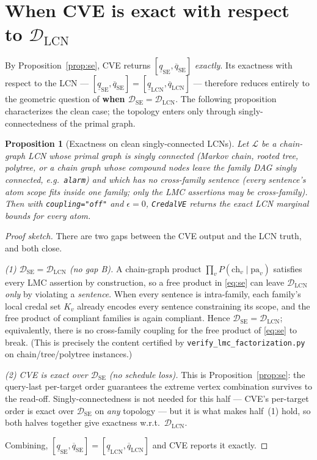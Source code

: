 \documentclass[11pt]{article}
\newtheorem{proposition}{Proposition}
\newcommand{\lo}{\underline}
\newcommand{\hi}{\overline}
\newcommand{\DSE}{\mathcal{D}_{\mathrm{SE}}}
\newcommand{\DLCN}{\mathcal{D}_{\mathrm{LCN}}}
\newcommand{\CVE}{\texttt{CredalVE}}
\begin{document}
\section{When CVE is exact with respect to $\DLCN$}\label{sec:exact}

By Proposition~\ref{prop:se}, CVE returns $[\lo q_{\mathrm{SE}},\hi q_{\mathrm{SE}}]$ \emph{exactly}.
Its exactness with respect to the LCN --- $[\lo q_{\mathrm{SE}},\hi q_{\mathrm{SE}}]=[\lo
q_{\mathrm{LCN}},\hi q_{\mathrm{LCN}}]$ --- therefore reduces entirely to the geometric question of
\textbf{when $\DSE=\DLCN$}. The following proposition characterizes the clean case; the topology
enters only through singly-connectedness of the primal graph.

\begin{proposition}[Exactness on clean singly-connected LCNs]\label{prop:exact}
Let $\mathcal L$ be a chain-graph LCN whose primal graph is singly connected (Markov chain, rooted
tree, polytree, or a chain graph whose compound nodes leave the family DAG singly connected, e.g.\
\texttt{alarm}) and which has \emph{no cross-family sentence} (every sentence's atom scope fits
inside one family; only the LMC assertions may be cross-family). Then with \texttt{coupling="off"}
and $\epsilon=0$, \CVE{} returns the exact LCN marginal bounds for every atom.
\end{proposition}

\begin{proof}[Proof sketch]
There are two gaps between the CVE output and the LCN truth, and both close.

\emph{(1) $\DSE=\DLCN$ (no gap B).} A chain-graph product $\prod_v P(\mathrm{ch}_v\mid\mathrm{pa}_v)$
satisfies every LMC assertion by construction, so a free product in \eqref{eq:se} can leave $\DLCN$
\emph{only} by violating a \emph{sentence}. When every sentence is intra-family, each family's local
credal set $K_v$ already encodes every sentence constraining its scope, and the free product of
compliant families is again compliant. Hence $\DSE=\DLCN$; equivalently, there is no cross-family
coupling for the free product of \eqref{eq:se} to break. (This is precisely the content certified by
\texttt{verify\_lmc\_factorization.py} on chain/tree/polytree instances.)

\emph{(2) CVE is exact over $\DSE$ (no schedule loss).} This is Proposition~\ref{prop:se}: the
query-last per-target order guarantees the extreme vertex combination survives to the read-off.
Singly-connectedness is not needed for this half --- CVE's per-target order is exact over $\DSE$ on
\emph{any} topology --- but it is what makes half~(1) hold, so both halves together give exactness
w.r.t.\ $\DLCN$.

Combining, $[\lo q_{\mathrm{SE}},\hi q_{\mathrm{SE}}]=[\lo q_{\mathrm{LCN}},\hi q_{\mathrm{LCN}}]$
and CVE reports it exactly.
\end{proof}
\end{document}
